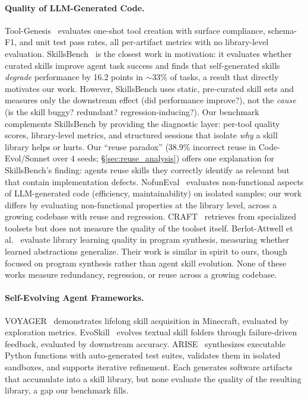\documentclass[sigplan,nonacm,natbib=false]{acmart}
\begin{document}
\paragraph{Quality of LLM-Generated Code.} Tool-Genesis~\cite{xia2026toolgenesis} evaluates one-shot tool creation with surface compliance, schema-F1, and unit test pass rates, all per-artifact metrics with no library-level evaluation. SkillsBench~\cite{skillsbench2026} is the closest work in motivation: it evaluates whether curated skills improve agent task success and finds that self-generated skills \emph{degrade} performance by 16.2 points in $\sim$33\% of tasks, a result that directly motivates our work. However, SkillsBench uses static, pre-curated skill sets and measures only the downstream effect (did performance improve?), not the \emph{cause} (is the skill buggy? redundant? regression-inducing?). Our benchmark complements SkillsBench by providing the diagnostic layer: per-tool quality scores, library-level metrics, and structured sessions that isolate \emph{why} a skill library helps or hurts. Our ``reuse paradox'' (38.9\% incorrect reuse in Code-Evol/Sonnet over 4 seeds; \S\ref{sec:reuse_analysis}) offers one explanation for SkillsBench's finding: agents reuse skills they correctly identify as relevant but that contain implementation defects. NofunEval~\cite{singhal2024nofuneval} evaluates non-functional aspects of LLM-generated code (efficiency, maintainability) on isolated samples; our work differs by evaluating non-functional properties at the library level, across a growing codebase with reuse and regression. CRAFT~\cite{yuan2023craft} retrieves from specialized toolsets but does not measure the quality of the toolset itself. Berlot-Attwell et al.~\cite{berlotattwell2026} evaluate library learning quality in program synthesis, measuring whether learned abstractions generalize. Their work is similar in spirit to ours, though focused on program synthesis rather than agent skill evolution. None of these works measure redundancy, regression, or reuse across a growing codebase.

\paragraph{Self-Evolving Agent Frameworks.} VOYAGER~\cite{wang2023voyager} demonstrates lifelong skill acquisition in Minecraft, evaluated by exploration metrics. EvoSkill~\cite{alzubi2026evoskill} evolves textual skill folders through failure-driven feedback, evaluated by downstream accuracy. ARISE~\cite{kaliyev2026arise} synthesizes executable Python functions with auto-generated test suites, validates them in isolated sandboxes, and supports iterative refinement. Each generates software artifacts that accumulate into a skill library, but none evaluate the quality of the resulting library, a gap our benchmark fills.
\end{document}
